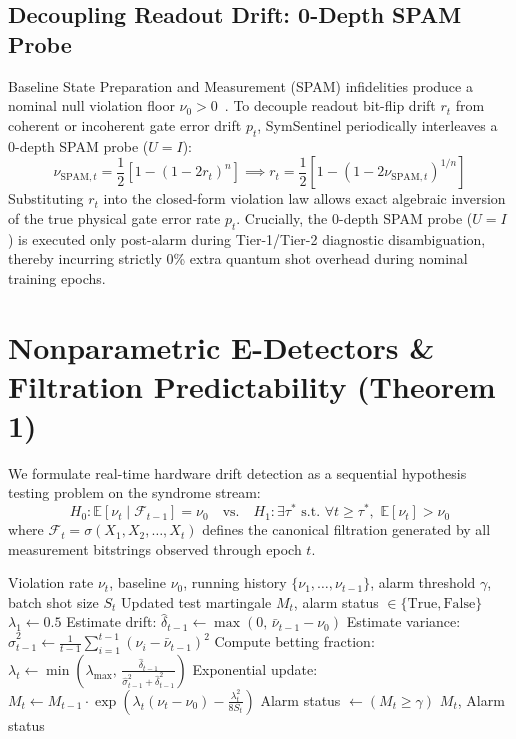 \documentclass[aps,pra,twocolumn,superscriptaddress,10pt,floatfix]{revtex4-2}
\begin{document}
\subsection{Decoupling Readout Drift: 0-Depth SPAM Probe}
Baseline State Preparation and Measurement (SPAM) infidelities produce a nominal null violation floor $\nu_0 > 0$~\cite{nation2021scalable,bravyi2021mitigating}. To decouple readout bit-flip drift $r_t$ from coherent or incoherent gate error drift $p_t$, SymSentinel periodically interleaves a 0-depth SPAM probe ($U = I$):
\begin{equation}
\nu_{\mathrm{SPAM}, t} = \frac{1}{2}\left[ 1 - (1 - 2r_t)^n \right] \implies r_t = \frac{1}{2}\left[ 1 - (1 - 2\nu_{\mathrm{SPAM}, t})^{1/n} \right]
\label{eq:spam_probe}
\end{equation}
Substituting $r_t$ into the closed-form violation law allows exact algebraic inversion of the true physical gate error rate $p_t$. Crucially, the 0-depth SPAM probe ($U = I$) is executed only post-alarm during Tier-1/Tier-2 diagnostic disambiguation, thereby incurring strictly 0\% extra quantum shot overhead during nominal training epochs.

\section{Nonparametric E-Detectors \& Filtration Predictability (Theorem 1)}
\label{sec:detector}
We formulate real-time hardware drift detection as a sequential hypothesis testing problem on the syndrome stream:
\begin{equation}
H_0: \mathbb{E}[\nu_t \mid \mathcal{F}_{t-1}] = \nu_0 \quad \text{vs.} \quad H_1: \exists \tau^* \text{ s.t. } \forall t \ge \tau^*, \,\, \mathbb{E}[\nu_t] > \nu_0
\end{equation}
where $\mathcal{F}_t = \sigma(X_1, X_2, \dots, X_t)$ defines the canonical filtration generated by all measurement bitstrings observed through epoch $t$.

\begin{algorithm}[t]
\caption{Filtration-Predictable Betting E-Detector with Kelly Optimization}
\label{alg:edetector}
\begin{algorithmic}[1]
\Require Violation rate $\nu_t$, baseline $\nu_0$, running history $\{\nu_1, \dots, \nu_{t-1}\}$, alarm threshold $\gamma$, batch shot size $S_t$
\Ensure Updated test martingale $M_t$, alarm status $\in \{\text{True}, \text{False}\}$
    \State $\lambda_1 \gets 0.5$
\Else
    \State Estimate drift: $\hat{\delta}_{t-1} \gets \max(0, \, \bar{\nu}_{t-1} - \nu_0)$
    \State Estimate variance: $\hat{\sigma}_{t-1}^2 \gets \frac{1}{t-1} \sum_{i=1}^{t-1} (\nu_i - \bar{\nu}_{t-1})^2$
    \State Compute betting fraction: $\lambda_t \gets \min\left( \lambda_{\max}, \, \frac{\hat{\delta}_{t-1}}{\hat{\sigma}_{t-1}^2 + \hat{\delta}_{t-1}^2} \right)$ 
\EndIf
\State Exponential update: $M_t \gets M_{t-1} \cdot \exp\left( \lambda_t (\nu_t - \nu_0) - \frac{\lambda_t^2}{8 S_t} \right)$
\State Alarm status $\gets (M_t \ge \gamma)$
\State \Return $M_t$, Alarm status
\end{algorithmic}
\end{algorithm}
\end{document}
